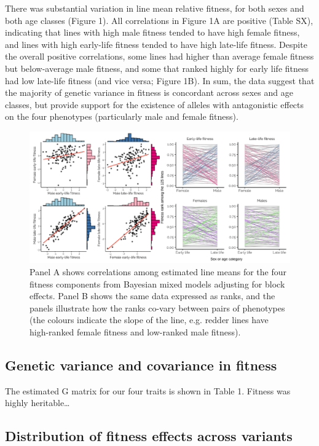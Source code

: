 \documentclass{article}
\begin{document}
There was substantial variation in line mean relative fitness, for both
sexes and both age classes (Figure 1). All correlations in Figure 1A are
positive (Table SX), indicating that lines with high male fitness tended
to have high female fitness, and lines with high early-life fitness
tended to have high late-life fitness. Despite the overall positive
correlations, some lines had higher than average female fitness but
below-average male fitness, and some that ranked highly for early life
fitness had low late-life fitness (and vice versa; Figure 1B). In sum,
the data suggest that the majority of genetic variance in fitness is
concordant across sexes and age classes, but provide support for the
existence of alleles with antagonistic effects on the four phenotypes
(particularly male and female fitness).

\begin{figure}[h]
\centering
\includegraphics[width=1.0\textwidth]{../figures/fig1.pdf}
\caption{\footnotesize{Panel A shows correlations among estimated line means for the four fitness components from Bayesian mixed models adjusting for block effects. Panel B shows the same data expressed as ranks, and the panels illustrate how the ranks co-vary between pairs of phenotypes (the colours indicate the slope of the line, e.g. redder lines have high-ranked female fitness and low-ranked male fitness).}}
\end{figure}
\newpage

\subsection*{Genetic variance and covariance in fitness}

The estimated G matrix for our four traits is shown in Table 1. Fitness
was highly heritable\ldots{}

\subsection*{Distribution of fitness effects across variants}
\end{document}
